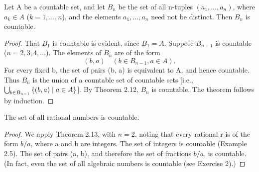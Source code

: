 \begin{theorem} %
  \label{thm:chap2:n_tuples_countable}
  Let A be a countable set, and let $B_n$ be the set of all n-tuples
  $(a_1, \dots, a_n)$, where $a_k \in A$ ($k=1, \dots, n$), and the
  elements $a_1, \dots, a_n$ need not be distinct. Then $B_n$ is countable.
  \begin{proof}
    That $B_1$ is countable is evident, since $B_1 = A$. Suppose
    $B_{n-1}$ is countable ($n=2, 3, 4, \dots$). The elements of
    $B_n$ are of the form
    \[ (b, a) \quad (b \in B_{n-1}, a \in A). \]
    For every fixed b, the set of pairs (b, a) is equivalent to A,
    and hence countable. Thus $B_n$ is the union of a countable set
    of countable sets [i.e., $\bigcup_{b \in B_{n-1}} \left\{ (b,a) \;\middle|\; a
    \in A \right\}$]. By Theorem 2.12, $B_n$ is countable. The theorem
    follows by induction.
  \end{proof}
\end{theorem}

\begin{corollary} %
  \label{cor:chap2:rationals_countable}
  The set of all rational numbers is countable.
  \begin{proof}
    We apply Theorem 2.13, with $n=2$, noting that every rational r
    is of the form $b/a$, where a and b are integers. The set of
    integers is countable (Example 2.5). The set of pairs (a, b), and
    therefore the set of fractions $b/a$, is countable.
    (In fact, even the set of all algebraic numbers is countable (see
    Exercise 2).)
  \end{proof}
\end{corollary}

